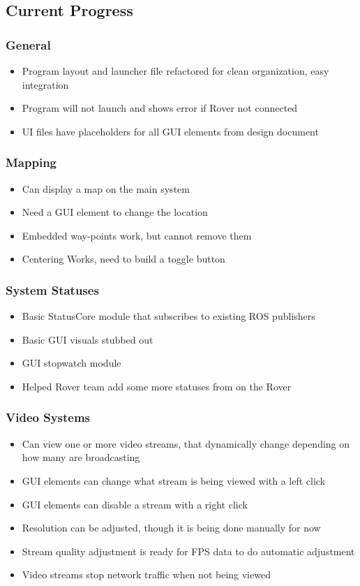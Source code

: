 \subsection{Current Progress}
\subsubsection{General}
\begin{itemize}
\item Program layout and launcher file refactored for clean organization, easy integration
\item Program will not launch and shows error if Rover not connected
\item UI files have placeholders for all GUI elements from design document
\end{itemize}

\subsubsection{Mapping}
\begin{itemize}
\item Can display a map on the main system
\item Need a GUI element to change the location
\item Embedded way-points work, but cannot remove them
\item Centering Works, need to build a toggle button
\end{itemize}

\subsubsection{System Statuses}
\begin{itemize}
\item Basic StatusCore module that subscribes to existing ROS publishers
\item Basic GUI visuals stubbed out
\item GUI stopwatch module
\item Helped Rover team add some more statuses from on the Rover
\end{itemize}

\subsubsection{Video Systems}
\begin{itemize}
\item Can view one or more video streams, that dynamically change depending on how many are broadcasting
\item GUI elements can change what stream is being viewed with a left click
\item GUI elements can disable a stream with a right click
\item Resolution can be adjusted, though it is being done manually for now
\item Stream quality adjustment is ready for FPS data to do automatic adjustment
\item Video streams stop network traffic when not being viewed
\end{itemize}